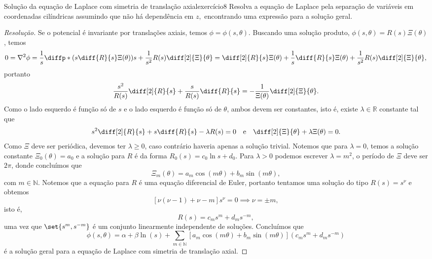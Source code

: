 \begin{exercício}{Solução da equação de Laplace com simetria de translação axial}{exercício8}
    Resolva a equação de Laplace pela separação de variáveis em coordenadas cilíndricas assumindo que não há dependência em \(z,\) encontrando uma expressão para a solução geral.
\end{exercício}
\begin{proof}[Resolução]
    Se o potencial é invariante por translações axiais, temos \(\phi = \phi(s, \theta)\). Buscando uma solução produto, \(\phi(s, \theta) = R(s)\Xi(\theta)\), temos
    \begin{equation*}
        0 = \nabla^2 \phi = \frac1s \diffp*{\left(s \diff{R}{s} \Xi(\theta)\right)}{s} + \frac{1}{s^2}R(s)\diff[2]{\Xi}{\theta} = \diff[2]{R}{s}\Xi(\theta) + \frac{1}{s} \diff{R}{s}\Xi(\theta) + \frac{1}{s^2} R(s) \diff[2]{\Xi}{\theta},
    \end{equation*}
    portanto
    \begin{equation*}
        \frac{s^2}{R(s)} \diff[2]{R}{s} + \frac{s}{R(s)} \diff{R}{s} = - \frac{1}{\Xi(\theta)} \diff[2]{\Xi}{\theta}.
    \end{equation*}
    Como o lado esquerdo é função só de \(s\) e o lado esquerdo é função só de \(\theta\), ambos devem ser constantes, isto é, existe \(\lambda\in \mathbb{R}\) constante tal que
    \begin{equation*}
        s^2 \diff[2]{R}{s} + s\diff{R}{s} - \lambda R(s) = 0 \quad\text{e}\quad \diff[2]{\Xi}{\theta} + \lambda \Xi(\theta) = 0.
    \end{equation*}
    Como \(\Xi\) deve ser periódica, devemos ter \(\lambda \geq 0\), caso contrário haveria apenas a solução trivial. Notemos que para \(\lambda = 0\), temos a solução constante \(\Xi_0(\theta) = a_0\) e a solução para \(R\) é da forma \(R_0(s) = c_0 \ln s + d_0\). Para \(\lambda > 0\) podemos escrever \(\lambda = m^2\), o período de \(\Xi\) deve ser \(2\pi\), donde concluímos que
    \begin{equation*}
        \Xi_m(\theta) = a_m\cos(m\theta) + b_m \sin(m\theta),
    \end{equation*}
    com \(m \in \mathbb{N}\). Notemos que a equação para \(R\) é uma equação diferencial de Euler, portanto tentamos uma solução do tipo \(R(s) = s^\nu\) e obtemos
    \begin{equation*}
        \left[\nu(\nu - 1) + \nu - m\right]s^\nu = 0 \implies \nu = \pm m,
    \end{equation*}
    isto é,
    \begin{equation*}
        R(s) = c_ms^m + d_m s^{-m},
    \end{equation*}
    uma vez que \(\set{s^m, s^{-m}}\) é um conjunto linearmente independente de soluções. Concluímos que
    \begin{equation*}
        \phi(s, \theta) = \alpha + \beta \ln(s) + \sum_{m \in \mathbb{N}} \left[a_m \cos(m\theta) + b_m\sin(m\theta)\right](c_m s^m + d_m s^{-m})
    \end{equation*}
    é a solução geral para a equação de Laplace com simetria de translação axial.
\end{proof}
